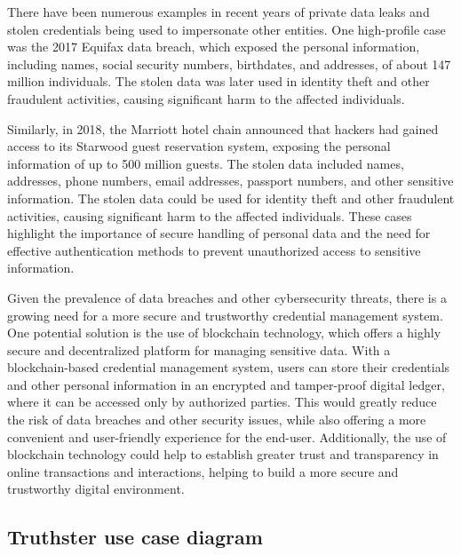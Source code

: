 \documentclass[target=mst,aauheader=]{thud}
\begin{document}
There have been numerous examples in recent years of private data leaks and stolen credentials being used to impersonate other entities. One high-profile case was the 2017 Equifax data breach\cite{equifaxDataBreachSettlement}, which exposed the personal information, including names, social security numbers, birthdates, and addresses, of about 147 million individuals. The stolen data was later used in identity theft and other fraudulent activities, causing significant harm to the affected individuals.\par
Similarly, in 2018, the Marriott hotel chain announced that hackers had gained access to its Starwood guest reservation system\cite{marriotDataBreach}, exposing the personal information of up to 500 million guests. The stolen data included names, addresses, phone numbers, email addresses, passport numbers, and other sensitive information. The stolen data could be used for identity theft and other fraudulent activities, causing significant harm to the affected individuals. These cases highlight the importance of secure handling of personal data and the need for effective authentication methods to prevent unauthorized access to sensitive information.\par
Given the prevalence of data breaches and other cybersecurity threats, there is a growing need for a more secure and trustworthy credential management system. One potential solution is the use of blockchain technology, which offers a highly secure and decentralized platform for managing sensitive data. With a blockchain-based credential management system, users can store their credentials and other personal information in an encrypted and tamper-proof digital ledger, where it can be accessed only by authorized parties. This would greatly reduce the risk of data breaches and other security issues, while also offering a more convenient and user-friendly experience for the end-user. Additionally, the use of blockchain technology could help to establish greater trust and transparency in online transactions and interactions, helping to build a more secure and trustworthy digital environment.

\subsection{Truthster use case diagram}
\end{document}
